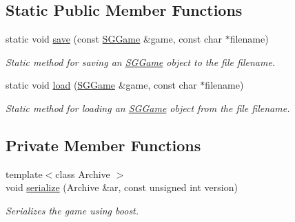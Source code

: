\subsection*{Static Public Member Functions}
\begin{DoxyCompactItemize}
\item 
\hypertarget{classSGGame_aaccf18a3663ec99360e5b6e64f2bf6e2}{static void \hyperlink{classSGGame_aaccf18a3663ec99360e5b6e64f2bf6e2}{save} (const \hyperlink{classSGGame}{S\-G\-Game} \&game, const char $\ast$filename)}\label{classSGGame_aaccf18a3663ec99360e5b6e64f2bf6e2}

\begin{DoxyCompactList}\small\item\em Static method for saving an \hyperlink{classSGGame}{S\-G\-Game} object to the file filename. \end{DoxyCompactList}\item 
\hypertarget{classSGGame_ac1dc35b84318448efc37b80afe210170}{static void \hyperlink{classSGGame_ac1dc35b84318448efc37b80afe210170}{load} (\hyperlink{classSGGame}{S\-G\-Game} \&game, const char $\ast$filename)}\label{classSGGame_ac1dc35b84318448efc37b80afe210170}

\begin{DoxyCompactList}\small\item\em Static method for loading an \hyperlink{classSGGame}{S\-G\-Game} object from the file filename. \end{DoxyCompactList}\end{DoxyCompactItemize}
\subsection*{Private Member Functions}
\begin{DoxyCompactItemize}
\item 
\hypertarget{classSGGame_a383c8f7ec881befac40d6e45c7e1b775}{{\footnotesize template$<$class Archive $>$ }\\void \hyperlink{classSGGame_a383c8f7ec881befac40d6e45c7e1b775}{serialize} (Archive \&ar, const unsigned int version)}\label{classSGGame_a383c8f7ec881befac40d6e45c7e1b775}

\begin{DoxyCompactList}\small\item\em Serializes the game using boost. \end{DoxyCompactList}\end{DoxyCompactItemize}
